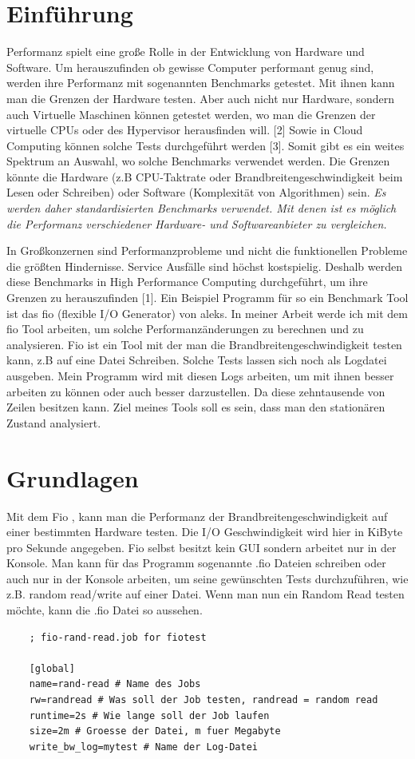 \documentclass{article}
\begin{document}
\tableofcontents{}


\newpage
\section{Einführung}
Performanz spielt eine große Rolle in der Entwicklung von Hardware und Software. Um herauszufinden ob gewisse Computer performant genug sind, werden ihre Performanz mit sogenannten 
Benchmarks getestet.
Mit ihnen kann man die Grenzen der Hardware testen. Aber auch nicht nur Hardware, sondern auch Virtuelle Maschinen können getestet werden, 
wo man die Grenzen der virtuelle CPUs oder des Hypervisor herausfinden will. [2]
Sowie in Cloud Computing können solche Tests durchgeführt werden [3]. Somit gibt es ein weites Spektrum an Auswahl, wo solche Benchmarks verwendet werden.
Die Grenzen könnte die Hardware (z.B CPU-Taktrate oder Brandbreitengeschwindigkeit beim Lesen oder Schreiben) oder Software (Komplexität von Algorithmen) sein. 
\textit{Es werden daher standardisierten Benchmarks verwendet. Mit denen ist es möglich die Performanz verschiedener Hardware- und
Softwareanbieter zu vergleichen.}

In Großkonzernen sind Performanzprobleme und nicht die funktionellen Probleme die größten Hindernisse. Service Ausfälle sind höchst kostspielig. 
Deshalb werden diese Benchmarks in High Performance Computing durchgeführt, um ihre Grenzen zu herauszufinden [1].
Ein Beispiel Programm für so ein Benchmark Tool ist das fio (flexible I/O Generator) von aleks.
In meiner Arbeit werde ich mit dem fio Tool arbeiten, um solche Performanzänderungen zu berechnen und zu analysieren.
Fio ist ein Tool mit der man die Brandbreitengeschwindigkeit testen kann, z.B auf eine Datei Schreiben. Solche Tests lassen sich noch als Logdatei ausgeben.
Mein Programm wird mit diesen Logs arbeiten, um mit ihnen besser arbeiten zu können oder auch besser darzustellen. Da diese zehntausende von Zeilen besitzen kann.
Ziel meines Tools soll es sein, dass man den stationären Zustand analysiert. 


\section{Grundlagen}
Mit dem Fio , kann man die Performanz der Brandbreitengeschwindigkeit auf einer bestimmten Hardware testen. 
Die I/O Geschwindigkeit wird hier in KiByte pro Sekunde angegeben. 
Fio selbst besitzt kein GUI sondern arbeitet nur in der Konsole. Man kann für das Programm sogenannte .fio Dateien schreiben oder auch nur in der Konsole arbeiten,
um seine gewünschten Tests durchzuführen,
wie z.B. random read/write auf einer Datei.
Wenn man nun ein Random Read testen möchte, kann die .fio Datei so aussehen.
\newline
\begin{lstlisting}
    ; fio-rand-read.job for fiotest

    [global]
    name=rand-read # Name des Jobs
    rw=randread # Was soll der Job testen, randread = random read
    runtime=2s # Wie lange soll der Job laufen
    size=2m # Groesse der Datei, m fuer Megabyte
    write_bw_log=mytest # Name der Log-Datei
\end{lstlisting}
\end{document}
